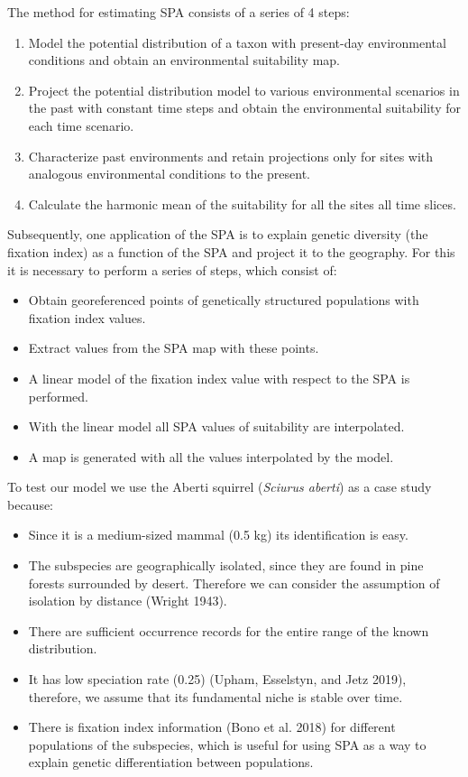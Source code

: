 \documentclass[
]{article}
\providecommand{\tightlist}{%
  \setlength{\itemsep}{0pt}\setlength{\parskip}{0pt}}
\begin{document}
The method for estimating SPA consists of a series of 4 steps:

\begin{enumerate}
\def\labelenumi{\arabic{enumi}.}
\tightlist
\item
  Model the potential distribution of a taxon with present-day
  environmental conditions and obtain an environmental suitability map.
\item
  Project the potential distribution model to various environmental
  scenarios in the past with constant time steps and obtain the
  environmental suitability for each time scenario.
\item
  Characterize past environments and retain projections only for sites
  with analogous environmental conditions to the present.
\item
  Calculate the harmonic mean of the suitability for all the sites all
  time slices.
\end{enumerate}

Subsequently, one application of the SPA is to explain genetic diversity
(the fixation index) as a function of the SPA and project it to the
geography. For this it is necessary to perform a series of steps, which
consist of:

\begin{itemize}
\tightlist
\item
  Obtain georeferenced points of genetically structured populations with
  fixation index values.
\item
  Extract values from the SPA map with these points.
\item
  A linear model of the fixation index value with respect to the SPA is
  performed.
\item
  With the linear model all SPA values of suitability are interpolated.
\item
  A map is generated with all the values interpolated by the model.
\end{itemize}

To test our model we use the Aberti squirrel (\emph{Sciurus aberti}) as
a case study because:

\begin{itemize}
\tightlist
\item
  Since it is a medium-sized mammal (0.5 kg) its identification is easy.
\item
  The subspecies are geographically isolated, since they are found in
  pine forests surrounded by desert. Therefore we can consider the
  assumption of isolation by distance (Wright 1943).
\item
  There are sufficient occurrence records for the entire range of the
  known distribution.
\item
  It has low speciation rate (0.25) (Upham, Esselstyn, and Jetz 2019),
  therefore, we assume that its fundamental niche is stable over time.
\item
  There is fixation index information (Bono et al. 2018) for different
  populations of the subspecies, which is useful for using SPA as a way
  to explain genetic differentiation between populations.
\end{itemize}
\end{document}
